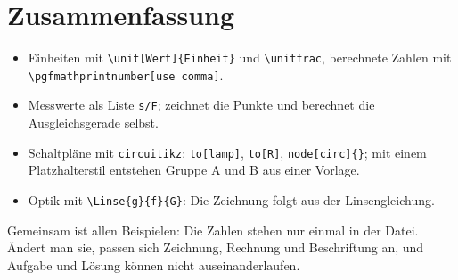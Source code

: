 \section{Zusammenfassung}

\begin{itemize}
	\item Einheiten mit \texttt{\textbackslash unit[Wert]\{Einheit\}} und \texttt{\textbackslash unitfrac}, berechnete Zahlen mit \texttt{\textbackslash pgfmathprintnumber[use comma]}.
	\item Messwerte als Liste \texttt{s/F}; \TikZ zeichnet die Punkte und berechnet die Ausgleichsgerade selbst.
	\item Schaltpläne mit \texttt{circuitikz}: \texttt{to[lamp]}, \texttt{to[R]}, \texttt{node[circ]\{\}}; mit einem Platzhalterstil entstehen Gruppe A und B aus einer Vorlage.
	\item Optik mit \texttt{\textbackslash Linse\{g\}\{f\}\{G\}}: Die Zeichnung folgt aus der Linsengleichung.
\end{itemize}

Gemeinsam ist allen Beispielen: Die Zahlen stehen nur einmal in der Datei. Ändert man sie, passen sich Zeichnung, Rechnung und Beschriftung an, und Aufgabe und Lösung können nicht auseinanderlaufen.


